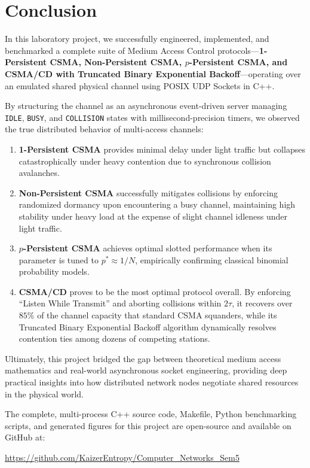 \documentclass[12pt, a4paper]{article}
\begin{document}
\section{Conclusion}

In this laboratory project, we successfully engineered, implemented, and benchmarked a complete suite of Medium Access Control protocols—\textbf{1-Persistent CSMA, Non-Persistent CSMA, $p$-Persistent CSMA, and CSMA/CD with Truncated Binary Exponential Backoff}—operating over an emulated shared physical channel using POSIX UDP Sockets in C++.

By structuring the channel as an asynchronous event-driven server managing \texttt{IDLE}, \texttt{BUSY}, and \texttt{COLLISION} states with millisecond-precision timers, we observed the true distributed behavior of multi-access channels:
\begin{enumerate}
    \item \textbf{1-Persistent CSMA} provides minimal delay under light traffic but collapses catastrophically under heavy contention due to synchronous collision avalanches.
    \item \textbf{Non-Persistent CSMA} successfully mitigates collisions by enforcing randomized dormancy upon encountering a busy channel, maintaining high stability under heavy load at the expense of slight channel idleness under light traffic.
    \item \textbf{$p$-Persistent CSMA} achieves optimal slotted performance when its parameter is tuned to $p^* \approx 1/N$, empirically confirming classical binomial probability models.
    \item \textbf{CSMA/CD} proves to be the most optimal protocol overall. By enforcing ``Listen While Transmit'' and aborting collisions within $2\tau$, it recovers over $85\%$ of the channel capacity that standard CSMA squanders, while its Truncated Binary Exponential Backoff algorithm dynamically resolves contention ties among dozens of competing stations.
\end{enumerate}

Ultimately, this project bridged the gap between theoretical medium access mathematics and real-world asynchronous socket engineering, providing deep practical insights into how distributed network nodes negotiate shared resources in the physical world.

The complete, multi-process C++ source code, Makefile, Python benchmarking scripts, and generated figures for this project are open-source and available on GitHub at:
\begin{center}
    \url{https://github.com/KaizerEntropy/Computer_Networks_Sem5}
\end{center}
\end{document}
